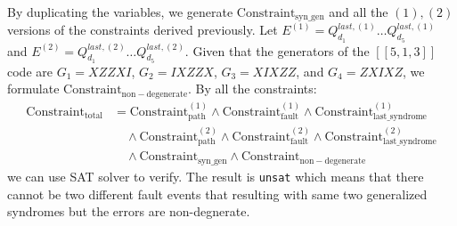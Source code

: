 \documentclass[acmsmallw,review]{acmart}
\begin{document}
By duplicating the variables, we generate $\mathrm{Constraint}_{\mathrm{syn\_gen}}$ and all the $(1), (2)$ versions of the constraints derived previously. Let $E^{(1)} = Q^{last,(1)}_{d_1} \dots  Q^{last,(1)}_{d_5}$ and $E^{(2)} =  Q^{last,(2)}_{d_1} \dots  Q^{last,(2)}_{d_5}$. Given that the generators of the $[[5,1,3]]$ code are $G_1 = XZZXI$, $G_2 = IXZZX$, $G_3=XIXZZ$, and $G_4 = ZXIXZ$, we formulate $\mathrm{Constraint}_{\mathrm{non-degenerate}}$. By all the constraints:
\begin{equation}
\begin{aligned}
\mathrm{Constraint}_{\mathrm{total}} &= \mathrm{Constraint}_{\mathrm{path}}^{(1)} \land \mathrm{Constraint}_{\mathrm{fault}}^{(1)} \land \mathrm{Constraint}_{\mathrm{last\_syndrome}}^{(1)} \\
&\quad \land \mathrm{Constraint}_{\mathrm{path}}^{(2)} \land \mathrm{Constraint}_{\mathrm{fault}}^{(2)} \land \mathrm{Constraint}_{\mathrm{last\_syndrome}}^{(2)} \\
&\quad \land \mathrm{Constraint}_{\mathrm{syn\_gen}} \land \mathrm{Constraint}_{\mathrm{non-degenerate}} 
\end{aligned}
\end{equation}
we can use SAT solver to verify. The result is \texttt{unsat} which means that there cannot be two different fault events that resulting with same two generalized syndromes but the errors are non-degnerate. 
 
\end{document}
